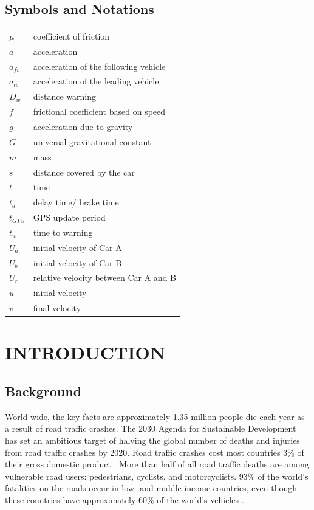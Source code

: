 \documentclass[12pt]{report}
\begin{document}
\newpage

\section*{Symbols and Notations}

\begin{tabular}{p{3cm} l}
	$\mu$						& coefficient of friction \\
	$a$ 						& acceleration \\
	$a_{fv}$					& acceleration of the following vehicle \\
	$a_{lv}$					& acceleration of the leading vehicle \\
	$D_w$						& distance warning \\
	$f$ 						& frictional coefficient based on speed \\
	$g$							& acceleration due to gravity \\
	$G$							& universal gravitational constant \\
	$m$							& mass \\
	$s$							& distance covered by the car \\
	$t$							& time \\
	$t_d$						& delay time/ brake time \\
	$t_{GPS}$					& GPS update period \\
	$t_w$						& time to warning \\
	$U_a$						& initial velocity of Car A \\
	$U_b$						& initial velocity of Car B \\
	$U_r$						& relative velocity between Car A and B \\
	$u$							& initial velocity \\
	$v$							& final velocity \\


	
	
\end{tabular}




\chapter{INTRODUCTION}

\section{Background}

World wide, the key facts are approximately 1.35 million people die each year as a result of road traffic crashes.
The 2030 Agenda for Sustainable Development has set an ambitious target of halving the global number of deaths and injuries from road traffic crashes by 2020.
Road traffic crashes cost most countries 3\% of their gross domestic product \cite{traffic}.
More than half of all road traffic deaths are among vulnerable road users: pedestrians, cyclists, and motorcyclists.
93\% of the world's fatalities on the roads occur in low- and middle-income countries, even though these countries have approximately 60\% of the world's vehicles \cite{traffic}.
 
\end{document}
